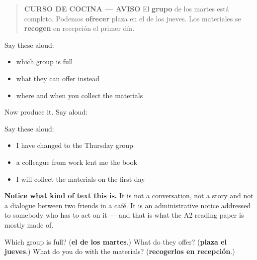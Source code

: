 \begin{quote}
\textbf{CURSO DE COCINA — AVISO} El \textbf{grupo} de los martes está completo. Podemos \textbf{ofrecer} plaza en el de los jueves. Los materiales se \textbf{recogen} en recepción el primer día.
\end{quote}

Say these aloud:

\begin{itemize}
\raggedright
  \item which group is full
  \item what they can offer instead
  \item where and when you collect the materials
\end{itemize}

\begin{grammarlens}[title={What you've built}]
Now produce it. Say aloud:

Say these aloud:

\begin{itemize}
\raggedright
  \item I have changed to the Thursday group
  \item a colleague from work lent me the book
  \item I will collect the materials on the first day
\end{itemize}

\textbf{Notice what kind of text this is.} It is not a conversation, not a story and not a dialogue between two friends in a café. It is an administrative notice addressed to somebody who has to act on it — and that is what the A2 reading paper is mostly made of.
\end{grammarlens}

\begin{tcolorbox}[breakable,colback=teal!4,colframe=teal!35!black,title={Before you move on}]
Which group is full? (\textbf{el de los martes}.) What do they offer? (\textbf{plaza el jueves}.) What do you do with the materials? (\textbf{recogerlos en recepción}.)
\end{tcolorbox}
